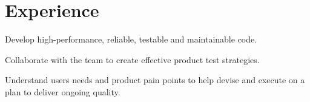 \documentclass[letterpaper]{deedy-resume} %
\begin{document}
\begin{minipage}[t]{0.66\textwidth} %

\section{Experience}


\vspace{\topsep} %
\begin{tightitemize}
\item Develop high-performance, reliable, testable and maintainable code.
\item Collaborate with the team to create effective product test strategies.
\item Understand users needs and product pain points to help devise and execute on a plan to deliver ongoing quality.
\end{tightitemize}

\sectionspace %




\end{minipage}
\end{document}
